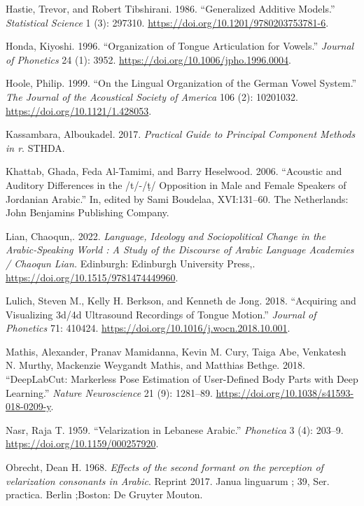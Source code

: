 \documentclass[
]{interact}
\newlength{\cslhangindent}
\newenvironment{CSLReferences}[2] %
 {\begin{list}{}{%
  \setlength{\itemindent}{0pt}
  \setlength{\leftmargin}{0pt}
  \setlength{\parsep}{0pt}
  \ifodd #1
   \setlength{\leftmargin}{\cslhangindent}
   \setlength{\itemindent}{-1\cslhangindent}
  \fi
  \setlength{\itemsep}{#2\baselineskip}}}
 {\end{list}}
\begin{document}
\begin{CSLReferences}{1}{0}
Hastie, Trevor, and Robert Tibshirani. 1986. {``Generalized Additive
Models.''} \emph{Statistical Science} 1 (3): 297310.
\url{https://doi.org/10.1201/9780203753781-6}.

Honda, Kiyoshi. 1996. {``Organization of Tongue Articulation for
Vowels.''} \emph{Journal of Phonetics} 24 (1): 3952.
\url{https://doi.org/10.1006/jpho.1996.0004}.

Hoole, Philip. 1999. {``On the Lingual Organization of the German Vowel
System.''} \emph{The Journal of the Acoustical Society of America} 106
(2): 10201032. \url{https://doi.org/10.1121/1.428053}.

Kassambara, Alboukadel. 2017. \emph{Practical Guide to Principal
Component Methods in r}. STHDA.

Khattab, Ghada, Feda Al-Tamimi, and Barry Heselwood. 2006. {``Acoustic
and Auditory Differences in the /t/-/ṭ/ Opposition in Male and Female
Speakers of Jordanian Arabic.''} In, edited by Sami Boudelaa,
XVI:131--60. The Netherlands: John Benjamins Publishing Company.

Lian, Chaoqun,. 2022. \emph{Language, Ideology and Sociopolitical Change
in the Arabic-Speaking World : A Study of the Discourse of Arabic
Language Academies / Chaoqun Lian.} Edinburgh: Edinburgh University
Press,. \url{https://doi.org/10.1515/9781474449960}.

Lulich, Steven M., Kelly H. Berkson, and Kenneth de Jong. 2018.
{``Acquiring and Visualizing 3d/4d Ultrasound Recordings of Tongue
Motion.''} \emph{Journal of Phonetics} 71: 410424.
\url{https://doi.org/10.1016/j.wocn.2018.10.001}.

Mathis, Alexander, Pranav Mamidanna, Kevin M. Cury, Taiga Abe, Venkatesh
N. Murthy, Mackenzie Weygandt Mathis, and Matthias Bethge. 2018.
{``DeepLabCut: Markerless Pose Estimation of User-Defined Body Parts
with Deep Learning.''} \emph{Nature Neuroscience} 21 (9): 1281--89.
\url{https://doi.org/10.1038/s41593-018-0209-y}.

Nasr, Raja T. 1959. {``Velarization in Lebanese Arabic.''}
\emph{Phonetica} 3 (4): 203--9. \url{https://doi.org/10.1159/000257920}.

Obrecht, Dean H. 1968. \emph{Effects of the second formant on the
perception of velarization consonants in Arabic}. Reprint 2017. Janua
linguarum ; 39, Ser. practica. Berlin ;Boston: De Gruyter Mouton.


\end{CSLReferences}
\end{document}
